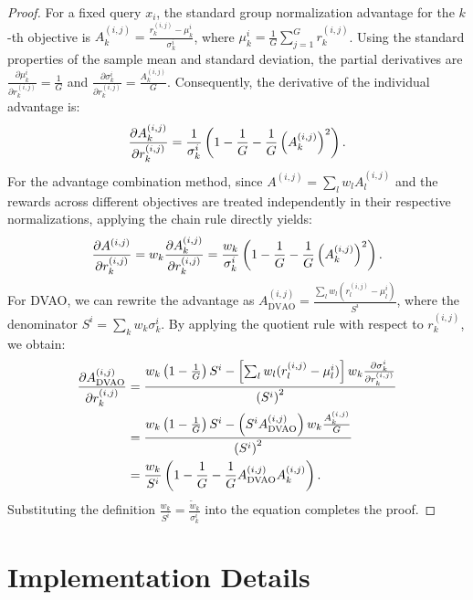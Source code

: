 \begin{proof}
    For a fixed query $x_i$, the standard group normalization advantage for the $k$-th objective is $A_k^{(i,j)} = \frac{r_k^{(i,j)} - \mu_k^i}{\sigma_k^i}$, where $\mu_k^i = \frac{1}{G} \sum_{j=1}^G r_k^{(i,j)}$. Using the standard properties of the sample mean and standard deviation, the partial derivatives are $\frac{\partial \mu_k^i}{\partial r_k^{(i,j)}} = \frac{1}{G}$ and $\frac{\partial \sigma_k^i}{\partial r_k^{(i,j)}} = \frac{A_k^{(i,j)}}{G}$. Consequently, the derivative of the individual advantage is:
    \begin{align}
        \frac{\partial A_k^{(i,j)}}{\partial r_k^{(i,j)}} = \frac{1}{\sigma_k^i} \left( 1 - \frac{1}{G} - \frac{1}{G} \left(A_k^{(i,j)}\right)^2 \right).\notag
    \end{align}
    For the advantage combination method, since $A^{(i,j)} = \sum_l w_l A_l^{(i,j)}$ and the rewards across different objectives are treated independently in their respective normalizations, applying the chain rule directly yields:
    \begin{align}
        \frac{\partial A^{(i,j)}}{\partial r_k^{(i,j)}} = w_k \frac{\partial A_k^{(i,j)}}{\partial r_k^{(i,j)}} = \frac{w_k}{\sigma_k^i} \left( 1 - \frac{1}{G} - \frac{1}{G} \left(A_k^{(i,j)}\right)^2 \right).\notag
    \end{align}
    For DVAO, we can rewrite the advantage as $A_\text{DVAO}^{(i,j)} = \frac{\sum_l w_l (r_l^{(i,j)} - \mu_l^i)}{S^i}$, where the denominator $S^i = \sum_k w_k \sigma_k^i$. By applying the quotient rule with respect to $r_k^{(i,j)}$, we obtain:
    \begin{align}
        \frac{\partial A_\text{DVAO}^{(i,j)}}{\partial r_k^{(i,j)}} &= \frac{w_k \left( 1 - \frac{1}{G} \right) S^i - \left[ \sum_l w_l (r_l^{(i,j)} - \mu_l^i) \right] w_k \frac{\partial \sigma_k^i}{\partial r_k^{(i,j)}}}{\left(S^i\right)^2} \notag\\
        &= \frac{w_k \left( 1 - \frac{1}{G} \right) S^i - \left( S^i A_\text{DVAO}^{(i,j)} \right) w_k \frac{A_k^{(i,j)}}{G}}{\left(S^i\right)^2} \notag\\
        &= \frac{w_k}{S^i} \left( 1 - \frac{1}{G} - \frac{1}{G} A_\text{DVAO}^{(i,j)} A_k^{(i,j)} \right).\notag
    \end{align}
    Substituting the definition $\frac{w_k}{S^i} = \frac{\tilde{w}_k}{\sigma_k^i}$ into the equation completes the proof.
\end{proof}

\section{Implementation Details}
\label{appendix:implementation_details}

